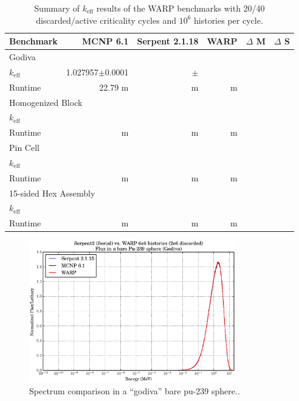\begin{table}[h]
\centering
\caption{Summary of $k_\mathrm{eff}$ results of the WARP benchmarks with 20/40 discarded/active criticality cycles and $10^6$ histories per cycle.}
\label{benchmark_summary}
\begin{tabular}{| l | r | r | r | r | r |}
 \hline
 Benchmark & MCNP 6.1 & Serpent 2.1.18 & WARP & $\Delta$ M & $\Delta$ S  \\
\hline
\hline
\multicolumn{6}{|l|}{Godiva}  \\
\hline
 $k_\mathrm{eff}$ & 1.027957$\pm$0.0001 & $\pm$ &  &  &   \\
 \hline
 Runtime               & 22.79 m &  m &  m &   &   \\
 \hline
 \hline
\multicolumn{6}{|l|}{Homogenized Block }\\
\hline
 $k_\mathrm{eff}$ & &  &  & &    \\
 \hline
 Runtime               & m &  m &  m & &  \\
 \hline
  \hline
\multicolumn{6}{|l|}{Pin Cell}\\
\hline
 $k_\mathrm{eff}$ & &  &  & &    \\
 \hline
 Runtime               & m &  m &  m & &  \\
 \hline
  \hline
\multicolumn{6}{|l|}{15-sided Hex Assembly}\\
\hline
 $k_\mathrm{eff}$ & &  &  & &    \\
 \hline
 Runtime               & m &  m &  m & &  \\
 \hline
\end{tabular}
\end{table}

\begin{figure}[h!] 
\centering
\includegraphics[width=0.8\textwidth]{graphics/finalresults/godiva_spec.eps}
\caption{Spectrum comparison in a ``godiva'' bare pu-239 sphere.. \label{godiva_spec} }
\end{figure}

